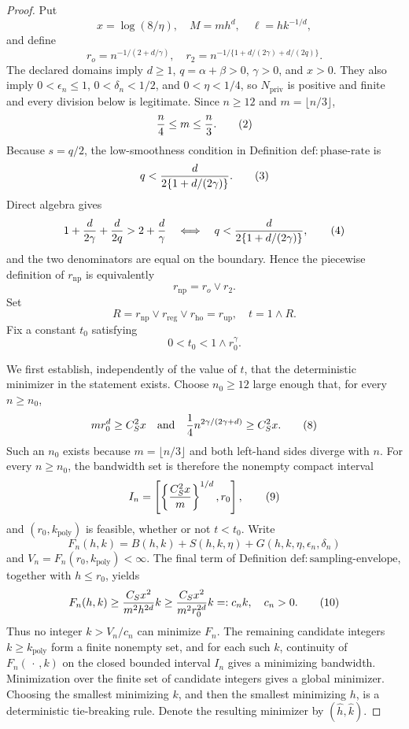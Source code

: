 \documentclass{article}
\begin{document}
\begin{proof}
Put
\[
 x=\log(8/\eta),\quad M=mh^d,\quad \ell=hk^{-1/d},
\]
and define
\[
 r_o=n^{-1/(2+d/\gamma)},
 \quad
 r_2=n^{-1/\{1+d/(2\gamma)+d/(2q)\}}.
\tag{1}
\]
The declared domains imply \(d\ge1\), \(q=\alpha+\beta>0\), \(\gamma>0\), and \(x>0\).  They also imply \(0<\epsilon_n\le1\), \(0<\delta_n<1/2\), and \(0<\eta<1/4\), so \(N_{\mathrm{priv}}\) is positive and finite and every division below is legitimate.  Since \(n\ge12\) and \(m=\lfloor n/3\rfloor\),
\[
 {n\over4}\le m\le {n\over3}.
\tag{2}
\]
Because \(s=q/2\), the low-smoothness condition in Definition \(\mathrm{def{:}phase\text{-}rate}\) is
\[
 q<{d\over2\{1+d/(2\gamma)\}}.
\tag{3}
\]
Direct algebra gives
\[
 1+{d\over2\gamma}+{d\over2q}>2+{d\over\gamma}
 \quad\Longleftrightarrow\quad
 q<{d\over2\{1+d/(2\gamma)\}},
\tag{4}
\]
and the two denominators are equal on the boundary.  Hence the piecewise definition of \(r_{\mathrm{np}}\) is equivalently
\[
 r_{\mathrm{np}}=r_o\vee r_2.
\tag{5}
\]
Set
\[
 R=r_{\mathrm{np}}\vee r_{\mathrm{reg}}\vee r_{\mathrm{ho}}
   =r_{\mathrm{up}},
 \quad
 t=1\wedge R.
\tag{6}
\]
Fix a constant \(t_0\) satisfying
\[
 0<t_0<1\wedge r_0^\gamma.
\tag{7}
\]

We first establish, independently of the value of \(t\), that the deterministic minimizer in the statement exists.  Choose \(n_0\ge12\) large enough that, for every \(n\ge n_0\),
\[
 mr_0^d\ge C_S^2x
 \quad\text{and}\quad
 {1\over4}n^{2\gamma/(2\gamma+d)}\ge C_S^2x.
\tag{8}
\]
Such an \(n_0\) exists because \(m=\lfloor n/3\rfloor\) and both left-hand sides diverge with \(n\).  For every \(n\ge n_0\), the bandwidth set is therefore the nonempty compact interval
\[
 I_n=\left[\left\{{C_S^2x\over m}\right\}^{1/d},r_0\right],
\tag{9}
\]
and \((r_0,k_{\mathrm{poly}})\) is feasible, whether or not \(t<t_0\).  Write
\[
 F_n(h,k)=B(h,k)+S(h,k,\eta)
       +G(h,k,\eta,\epsilon_n,\delta_n)
\]
and \(V_n=F_n(r_0,k_{\mathrm{poly}})<\infty\).  The final term of Definition \(\mathrm{def{:}sampling\text{-}envelope}\), together with \(h\le r_0\), yields
\[
 F_n(h,k)
 \ge {C_Sx^2\over m^2h^{2d}}k
 \ge {C_Sx^2\over m^2r_0^{2d}}k
 =:c_nk,
 \quad c_n>0.
\tag{10}
\]
Thus no integer \(k>V_n/c_n\) can minimize \(F_n\).  The remaining candidate integers \(k\ge k_{\mathrm{poly}}\) form a finite nonempty set, and for each such \(k\), continuity of \(F_n(\,\cdot\,,k)\) on the closed bounded interval \(I_n\) gives a minimizing bandwidth.  Minimization over the finite set of candidate integers gives a global minimizer.  Choosing the smallest minimizing \(k\), and then the smallest minimizing \(h\), is a deterministic tie-breaking rule.  Denote the resulting minimizer by \((\widehat h,\widehat k)\).


\end{proof}
\end{document}
